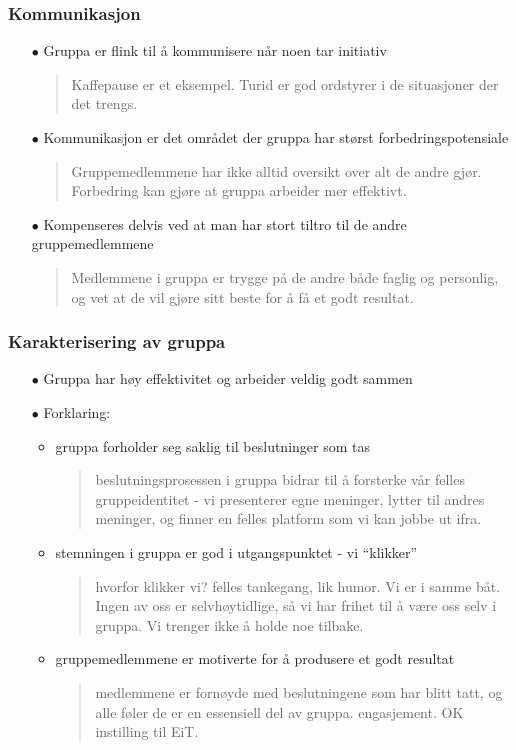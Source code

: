 \documentclass[screen]{beamer}
\begin{document}
\begin{frame}
  \frametitle{Kommunikasjon}
  \begin{itemize}
    \item[$\bullet$] Gruppa er flink til å kommunisere når noen tar initiativ
      \begin{quote}{
	\tiny
      Kaffepause er et eksempel. Turid er god ordstyrer i de situasjoner der
      det trengs.}
      \end{quote}
    \item[$\bullet$] Kommunikasjon er det området der gruppa har størst forbedringspotensiale
      \begin{quote}{
	\tiny
      Gruppemedlemmene har ikke alltid oversikt over alt de andre gjør.
      Forbedring kan gjøre at gruppa arbeider mer effektivt.}
      \end{quote}
    \item[$\bullet$] Kompenseres delvis ved at man har stort tiltro til de andre gruppemedlemmene
      \begin{quote}{
	\tiny
      Medlemmene i gruppa er trygge på de andre både faglig og personlig, og
      vet at de vil gjøre sitt beste for å få et godt resultat.}
      \end{quote}
  \end{itemize}
\end{frame}

\begin{frame}
  \frametitle{Karakterisering av gruppa}
  \begin{itemize}
    \item[$\bullet$] Gruppa har høy effektivitet og arbeider veldig godt sammen
    \item[$\bullet$] Forklaring:
      \begin{itemize}
	\item gruppa forholder seg saklig til beslutninger som tas
	  \begin{quote}{
	    \tiny
	  beslutningsprosessen i gruppa bidrar til å forsterke vår felles
	  gruppeidentitet - vi presenterer egne meninger, lytter til andres
	  meninger, og finner en felles platform som vi kan jobbe ut ifra.}
	  \end{quote}
	\item stemningen i gruppa er god i utgangspunktet - vi ``klikker''
	  \begin{quote}{
	    \tiny
	  hvorfor klikker vi? felles tankegang, lik humor. Vi er i samme båt.
	  Ingen av oss er selvhøytidlige, så vi har frihet til å være oss selv
	  i gruppa. Vi trenger ikke å holde noe tilbake.}
	  \end{quote}
	\item gruppemedlemmene er motiverte for å produsere et godt resultat
	  \begin{quote}{
	    \tiny
	  medlemmene er fornøyde med beslutningene som har blitt tatt, og alle
	  føler de er en essensiell del av gruppa. engasjement. OK instilling
	  til EiT.}
	  \end{quote}
      \end{itemize}
  \end{itemize}
\end{frame}
\end{document}

